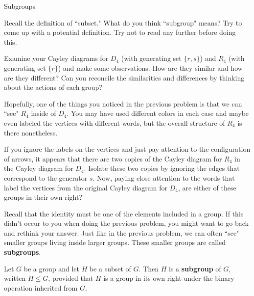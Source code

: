 \begin{section}{Subgroups}\label{sec:Subgroups}


\begin{problem}
Recall the definition of ``subset."  What do you think ``subgroup" means?  Try to come up with a potential definition.  Try not to read any further before doing this.
\end{problem}

\begin{problem}\label{prob:R4_in_D4}
Examine your Cayley diagrams for $D_4$ (with generating set $\{r,s\}$) and $R_4$ (with generating set $\{r\}$) and make some observations.  How are they similar and how are they different?  Can you reconcile the similarities and differences by thinking about the actions of each group?
\end{problem}

Hopefully, one of the things you noticed in the previous problem is that we can ``see" $R_4$ inside of $D_4$.  You may have used different colors in each case and maybe even labeled the vertices with different words, but the overall structure of $R_4$ is there nonetheless.

\begin{problem}\label{prob:R4_subgroup_D_4}
If you ignore the labels on the vertices and just pay attention to the configuration of arrows, it appears that there are two copies of the Cayley diagram for $R_4$ in the Cayley diagram for $D_4$.  Isolate these two copies by ignoring the edges that correspond to the generator $s$.  Now, paying close attention to the words that label the vertices from the original Cayley diagram for $D_4$, are either of these groups in their own right?
\end{problem}

Recall that the identity must be one of the elements included in a group.  If this didn't occur to you when doing the previous problem, you might want to go back and rethink your answer.  Just like in the previous problem, we can often ``see" smaller groups living inside larger groups.  These smaller groups are called \textbf{subgroups}.

\begin{definition}
Let $G$ be a group and let $H$ be a subset of $G$.  Then $H$ is a \textbf{subgroup} of $G$, written $H\leq G$, provided that $H$ is a group in its own right under the binary operation inherited from $G$.
\end{definition}


\end{section}
